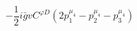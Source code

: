 %
\begin{dmath*}
%
  -  \frac{1}{2} i {\bar g}{} vC^{ \varphi  D} \left(2 p_1^{\mu_4} - p_2^{\mu_4} - p_3^{\mu_4}\right)
%
\end{dmath*}
%
